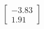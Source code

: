 \documentclass[preview]{standalone}
\begin{document}
\begin{align*}
\begin{bmatrix} -3.83 \\ 1.91 \end{bmatrix}
\end{align*}
\end{document}

